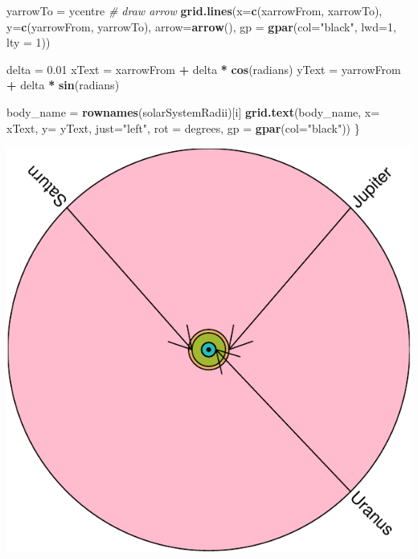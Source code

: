 \documentclass[9pt,letter]{article}
\newenvironment{Shaded}{\begin{snugshade}}{\end{snugshade}}
\newcommand{\KeywordTok}[1]{\textcolor[rgb]{0.13,0.29,0.53}{\textbf{#1}}}
\newcommand{\DataTypeTok}[1]{\textcolor[rgb]{0.13,0.29,0.53}{#1}}
\newcommand{\DecValTok}[1]{\textcolor[rgb]{0.00,0.00,0.81}{#1}}
\newcommand{\FloatTok}[1]{\textcolor[rgb]{0.00,0.00,0.81}{#1}}
\newcommand{\StringTok}[1]{\textcolor[rgb]{0.31,0.60,0.02}{#1}}
\newcommand{\CommentTok}[1]{\textcolor[rgb]{0.56,0.35,0.01}{\textit{#1}}}
\newcommand{\OperatorTok}[1]{\textcolor[rgb]{0.81,0.36,0.00}{\textbf{#1}}}
\newcommand{\NormalTok}[1]{#1}
\begin{document}
\begin{Shaded}
\begin{Highlighting}[]
\NormalTok{  yarrowTo =}\StringTok{ }\NormalTok{ycentre}
  \CommentTok{# draw arrow}
  \KeywordTok{grid.lines}\NormalTok{(}\DataTypeTok{x=}\KeywordTok{c}\NormalTok{(xarrowFrom, xarrowTo), }\DataTypeTok{y=}\KeywordTok{c}\NormalTok{(yarrowFrom, yarrowTo), }
             \DataTypeTok{arrow=}\KeywordTok{arrow}\NormalTok{(),}
             \DataTypeTok{gp =} \KeywordTok{gpar}\NormalTok{(}\DataTypeTok{col=}\StringTok{"black"}\NormalTok{, }\DataTypeTok{lwd=}\DecValTok{1}\NormalTok{, }\DataTypeTok{lty =} \DecValTok{1}\NormalTok{))}
  
\NormalTok{  delta =}\StringTok{ }\FloatTok{0.01}
\NormalTok{  xText =}\StringTok{ }\NormalTok{xarrowFrom }\OperatorTok{+}\StringTok{ }\NormalTok{delta }\OperatorTok{*}\StringTok{ }\KeywordTok{cos}\NormalTok{(radians)}
\NormalTok{  yText =}\StringTok{ }\NormalTok{yarrowFrom }\OperatorTok{+}\StringTok{ }\NormalTok{delta }\OperatorTok{*}\StringTok{ }\KeywordTok{sin}\NormalTok{(radians)}
  
\NormalTok{  body_name =}\StringTok{ }\KeywordTok{rownames}\NormalTok{(solarSystemRadii)[i]}
  \KeywordTok{grid.text}\NormalTok{(body_name, }\DataTypeTok{x=}\NormalTok{ xText, }\DataTypeTok{y=}\NormalTok{ yText,}
            \DataTypeTok{just=}\StringTok{"left"}\NormalTok{, }\DataTypeTok{rot =}\NormalTok{ degrees,}
            \DataTypeTok{gp =} \KeywordTok{gpar}\NormalTok{(}\DataTypeTok{col=}\StringTok{"black"}\NormalTok{))}
\NormalTok{\}}
\end{Highlighting}
\end{Shaded}

\begin{center}\includegraphics{a3_solutions_files/figure-latex/unnamed-chunk-12-1} \end{center}
\end{document}
